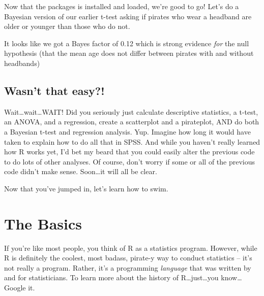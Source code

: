 \documentclass[]{book}
\newenvironment{Shaded}{\begin{snugshade}}{\end{snugshade}}
\newcommand{\KeywordTok}[1]{\textcolor[rgb]{0.13,0.29,0.53}{\textbf{#1}}}
\newcommand{\DataTypeTok}[1]{\textcolor[rgb]{0.13,0.29,0.53}{#1}}
\newcommand{\StringTok}[1]{\textcolor[rgb]{0.31,0.60,0.02}{#1}}
\newcommand{\CommentTok}[1]{\textcolor[rgb]{0.56,0.35,0.01}{\textit{#1}}}
\newcommand{\OperatorTok}[1]{\textcolor[rgb]{0.81,0.36,0.00}{\textbf{#1}}}
\newcommand{\NormalTok}[1]{#1}
\theoremstyle{definition}
\theoremstyle{definition}
\theoremstyle{remark}
\begin{document}
Now that the packages is installed and loaded, we're good to go! Let's
do a Bayesian version of our earlier t-test asking if pirates who wear a
headband are older or younger than those who do not.

\begin{Shaded}
\end{Shaded}

It looks like we got a Bayes factor of 0.12 which is strong evidence
\emph{for} the null hypothesis (that the mean age does not differ
between pirates with and without headbands)

\section{Wasn't that easy?!}\label{wasnt-that-easy}

Wait\ldots{}wait\ldots{}WAIT! Did you seriously just calculate
descriptive statistics, a t-test, an ANOVA, and a regression, create a
scatterplot and a pirateplot, AND do both a Bayesian t-test and
regression analysis. Yup. Imagine how long it would have taken to
explain how to do all that in SPSS. And while you haven't really learned
how R works yet, I'd bet my beard that you could easily alter the
previous code to do lots of other analyses. Of course, don't worry if
some or all of the previous code didn't make sense. Soon\ldots{}it will
all be clear.

Now that you've jumped in, let's learn how to swim.

\chapter{The Basics}\label{basics}

If you're like most people, you think of R as a statistics program.
However, while R is definitely the coolest, most badass, pirate-y way to
conduct statistics -- it's not really a program. Rather, it's a
programming \emph{language} that was written by and for statisticians.
To learn more about the history of R\ldots{}just\ldots{}you
know\ldots{}Google it.
\end{document}
